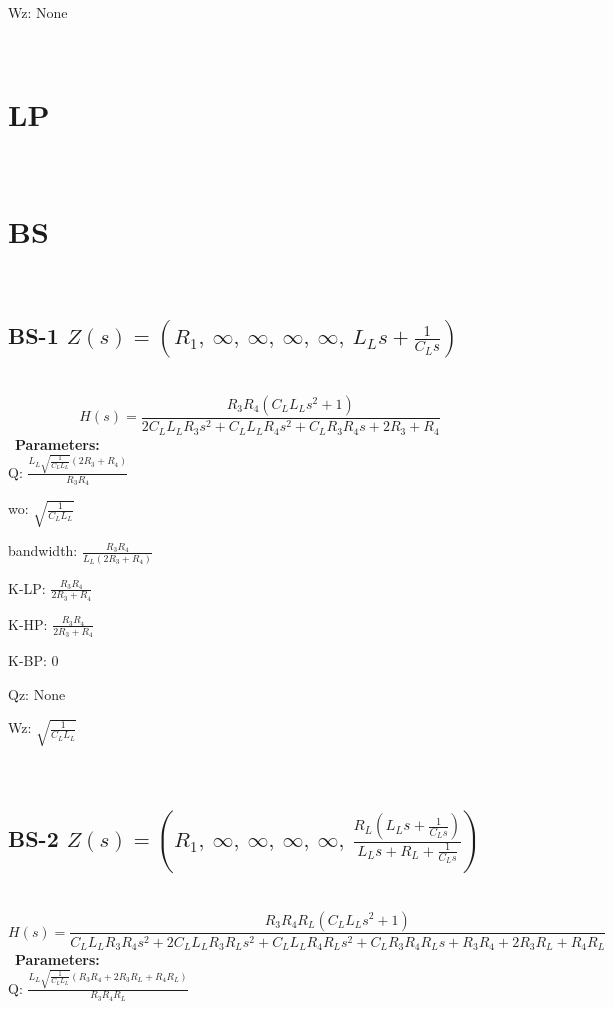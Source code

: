\documentclass{article}
\begin{document}
Wz: $\text{None}$\ 

\ 

\section{LP}\ 
\section{BS}\ 
\subsection{BS-1 $Z(s) = \left( R_{1}, \  \infty, \  \infty, \  \infty, \  \infty, \  L_{L} s + \frac{1}{C_{L} s}\right)$ } \ 
\textbf{\[H(s) = \frac{R_{3} R_{4} \left(C_{L} L_{L} s^{2} + 1\right)}{2 C_{L} L_{L} R_{3} s^{2} + C_{L} L_{L} R_{4} s^{2} + C_{L} R_{3} R_{4} s + 2 R_{3} + R_{4}}\] } \ 
\textbf{Parameters:}\\ 

Q: $\frac{L_{L} \sqrt{\frac{1}{C_{L} L_{L}}} \left(2 R_{3} + R_{4}\right)}{R_{3} R_{4}}$\ 

wo: $\sqrt{\frac{1}{C_{L} L_{L}}}$\ 

bandwidth: $\frac{R_{3} R_{4}}{L_{L} \left(2 R_{3} + R_{4}\right)}$\ 

K-LP: $\frac{R_{3} R_{4}}{2 R_{3} + R_{4}}$\ 

K-HP: $\frac{R_{3} R_{4}}{2 R_{3} + R_{4}}$\ 

K-BP: $0$\ 

Qz: $\text{None}$\ 

Wz: $\sqrt{\frac{1}{C_{L} L_{L}}}$\ 

\ 

\subsection{BS-2 $Z(s) = \left( R_{1}, \  \infty, \  \infty, \  \infty, \  \infty, \  \frac{R_{L} \left(L_{L} s + \frac{1}{C_{L} s}\right)}{L_{L} s + R_{L} + \frac{1}{C_{L} s}}\right)$ } \ 
\textbf{\[H(s) = \frac{R_{3} R_{4} R_{L} \left(C_{L} L_{L} s^{2} + 1\right)}{C_{L} L_{L} R_{3} R_{4} s^{2} + 2 C_{L} L_{L} R_{3} R_{L} s^{2} + C_{L} L_{L} R_{4} R_{L} s^{2} + C_{L} R_{3} R_{4} R_{L} s + R_{3} R_{4} + 2 R_{3} R_{L} + R_{4} R_{L}}\] } \ 
\textbf{Parameters:}\\ 

Q: $\frac{L_{L} \sqrt{\frac{1}{C_{L} L_{L}}} \left(R_{3} R_{4} + 2 R_{3} R_{L} + R_{4} R_{L}\right)}{R_{3} R_{4} R_{L}}$\ 
\end{document}
